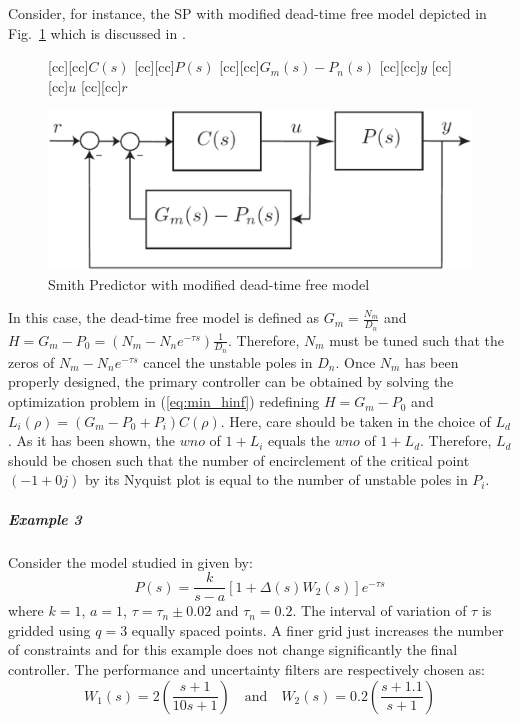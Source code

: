 \documentclass[default]{svmult}
\begin{document}
Consider, for instance, the SP with modified dead-time free model depicted in Fig.~\ref{fig:dtc_modified} which is discussed in \cite{NC07}. 
\begin{figure}
\centering
{}[cc][cc]{$C(s)$}
[cc][cc]{$P(s)$}
[cc][cc]{$G_m(s)-P_n(s)$}
[cc][cc]{$y$}
[cc][cc]{$u$}
[cc][cc]{$r$}
\centerline{{\includegraphics[scale=.26]{fig/uns.eps}}}
\caption{Smith Predictor with modified dead-time free model}
\label{fig:dtc_modified}
\end{figure}%
In this case, the dead-time free model is defined as $G_m=\frac{N_m}{D_n}$ and $H=G_m-P_0=(N_m -N_ne^{-\tau s})\frac{1}{D_n}$. Therefore, $N_m$ must be tuned such that the zeros of $N_m -N_ne^{-\tau s}$ cancel the unstable poles in $D_n$. Once $N_m$ has been properly designed, the primary controller can be obtained by solving the optimization problem in (\ref{eq:min_hinf}) redefining $H=G_m-P_0$ and
$L_i(\rho)=(G_m-P_0+P_i)C(\rho)$. Here, care should be taken in the choice of $L_d$. As it has been shown, the $wno$ of $1+L_i$ equals the $wno$ of $1+L_d$. Therefore, $L_d$ should be chosen such that the number of encirclement of the critical point $(-1+0j)$ by its Nyquist plot is equal to the number of unstable poles in $P_i$.

\subparagraph{Example 3}
Consider the model studied in \cite{MZ00} given by:
\begin{equation}
P(s)=\frac{k}{s-a}[1+\Delta(s)W_2(s)]e^{-\tau s}
\end{equation}  
where $k=1$, $a=1$, $\tau=\tau_n \pm 0.02$ and $\tau_n=0.2$. The interval of variation of $\tau$ is gridded using $q=3$ equally spaced points. A finer grid just increases the number of constraints and for this example does not change significantly the final controller.
The performance and uncertainty filters are respectively chosen as:
\begin{equation}
W_1(s)=2\left(\frac{s+1}{10s+1}\right) \quad \mbox{and} \quad  W_2(s)=0.2\left(\frac{s+1.1}{s+1}\right)
\end{equation}
\end{document}

